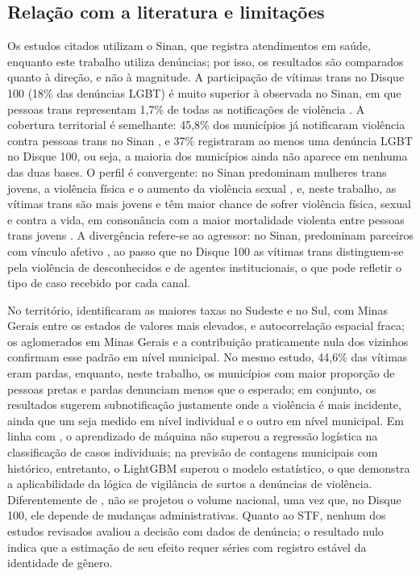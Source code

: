 \documentclass[12pt]{article}
\begin{document}
\subsection{Relação com a literatura e limitações}

Os estudos citados utilizam o Sinan, que registra atendimentos em saúde, enquanto este trabalho utiliza denúncias; por isso, os resultados são comparados quanto à direção, e não à magnitude. A participação de vítimas trans no Disque 100 (18\% das denúncias LGBT) é muito superior à observada no Sinan, em que pessoas trans representam 1,7\% de todas as notificações de violência \cite{marinho_tomazelli_firianelli:2024}. A cobertura territorial é semelhante: 45,8\% dos municípios já notificaram violência contra pessoas trans no Sinan \cite{marinho_tomazelli_firianelli:2024}, e 37\% registraram ao menos uma denúncia LGBT no Disque 100, ou seja, a maioria dos municípios ainda não aparece em nenhuma das duas bases. O perfil é convergente: no Sinan predominam mulheres trans jovens, a violência física e o aumento da violência sexual \cite{leal_silva_lizzi:2026,marinho_tomazelli_firianelli:2024}, e, neste trabalho, as vítimas trans são mais jovens e têm maior chance de sofrer violência física, sexual e contra a vida, em consonância com a maior mortalidade violenta entre pessoas trans jovens \cite{luis:2025}. A divergência refere-se ao agressor: no Sinan, predominam parceiros com vínculo afetivo \cite{marinho_tomazelli_firianelli:2024}, ao passo que no Disque 100 as vítimas trans distinguem-se pela violência de desconhecidos e de agentes institucionais, o que pode refletir o tipo de caso recebido por cada canal.

No território, \cite{leal_silva_lizzi:2026} identificaram as maiores taxas no Sudeste e no Sul, com Minas Gerais entre os estados de valores mais elevados, e autocorrelação espacial fraca; os aglomerados em Minas Gerais e a contribuição praticamente nula dos vizinhos confirmam esse padrão em nível municipal. No mesmo estudo, 44,6\% das vítimas eram pardas, enquanto, neste trabalho, os municípios com maior proporção de pessoas pretas e pardas denunciam menos que o esperado; em conjunto, os resultados sugerem subnotificação justamente onde a violência é mais incidente, ainda que um seja medido em nível individual e o outro em nível municipal. Em linha com \cite{lucca_romero_sbbd:2026}, o aprendizado de máquina não superou a regressão logística na classificação de casos individuais; na previsão de contagens municipais com histórico, entretanto, o LightGBM superou o modelo estatístico, o que demonstra a aplicabilidade da lógica de vigilância de surtos \cite{held_hohle_hofmann:2005} a denúncias de violência. Diferentemente de \cite{coelho_jiv:2025}, não se projetou o volume nacional, uma vez que, no Disque 100, ele depende de mudanças administrativas. Quanto ao STF, nenhum dos estudos revisados avaliou a decisão com dados de denúncia; o resultado nulo indica que a estimação de seu efeito requer séries com registro estável da identidade de gênero.
\end{document}

